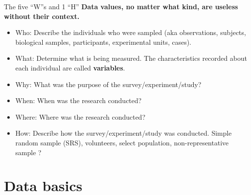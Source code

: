 \documentclass[10pt,handout]{beamer}\usepackage[]{graphicx}\usepackage[]{color}
\begin{document}
\begin{frame}{The five ``W''s and 1 ``H''}
	\textbf{Data values, no matter what kind, are useless without their context.}
	\pause 
	
	\begin{itemize}
		\item \alert{Who:}  Describe the individuals who were sampled (aka observations, subjects, biological samples, participants, experimental units, cases).
		
		\item \alert{What:}  Determine what is being measured. The characteristics recorded about each individual are called \textbf{variables}.
		
		\pause
		
		\item \alert{Why:}  What was the purpose of the survey/experiment/study?
		
		\item \alert{When:}  When was the research conducted?
		
		\item \alert{Where:}  Where was the research conducted?
		
	\pause
		
		\item \alert{How:}  Describe how the survey/experiment/study was conducted. Simple random sample (SRS), volunteers, select population, non-representative sample ?
	\end{itemize}
	
\end{frame}



\section{Data basics}
\end{document}
